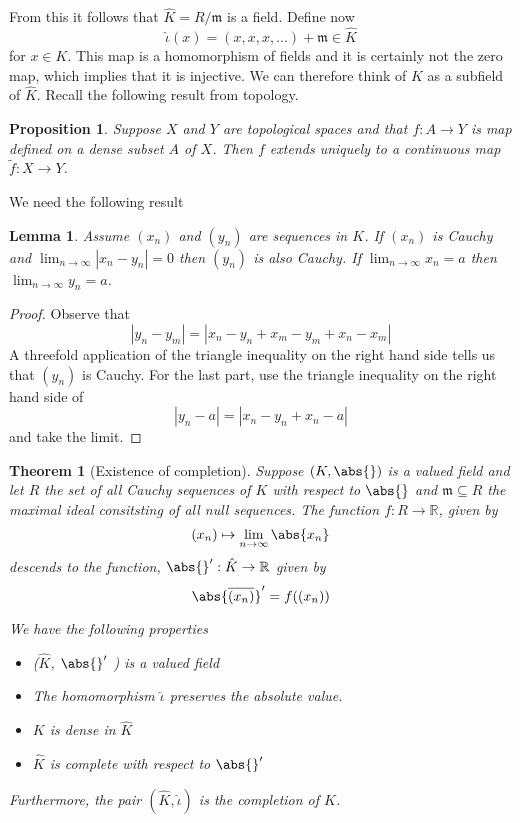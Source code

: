 \documentclass{article}
\newtheorem{theorem}{Theorem}[section]
\newtheorem{proposition}{Proposition}[section]
\newtheorem{lemma}{Lemma}[section]
\newcommand{\mfrak}[1]{\mathfrak{#1}}
\newcommand{\mbb}[1]{\mathbb{#1}}
\numberwithin{equation}{section}
\begin{document}
From this it follows that $\hat K = R / \mfrak m$ is a field. Define now $$\hat \iota (x) = (x,x,x,...) + \mfrak m \in \hat K$$ for $x \in K$. This map is a homomorphism of fields and it is certainly not the zero map, which implies that it is injective. We can therefore think of $K$ as a subfield of $\hat K$. Recall the following result from topology.
\begin{proposition}\label{prop: Function on a dense set}
	Suppose $X$ and $Y$ are topological spaces and that $f : A \to Y$ is map defined on a dense subset $A$ of $X$. Then $f$ extends uniquely to a continuous map $\tilde f : X \to Y$.
\end{proposition}
We need the following result

\begin{lemma}\label{lem: Helper result for existence of completion}
	Assume $(x_n)$ and $(y_n)$ are sequences in $K$. If $(x_n)$ is Cauchy and $\lim_{n \to \infty} |x_n - y_n| = 0$ then $(y_n)$ is also Cauchy. If $\lim_{n \to \infty} x_n = a$ then $\lim_{n \to \infty} y_n = a$.
\end{lemma}

\begin{proof}
	Observe that
	$$
    	|y_n - y_m| = |x_n - y_n + x_m - y_m + x_n - x_m|
    	$$
	A threefold application of the triangle inequality on the right hand side tells us that $(y_n)$ is Cauchy. For the last part, use the triangle inequality on the right hand side of
	$$|y_n - a| = |x_n - y_n + x_n - a|$$
	and take the limit.
\end{proof}

\begin{theorem}[Existence of completion]\label{thm: Existence of completion}
	Suppose $(K, \abs{})$ is a valued field and let $R$ the set of all Cauchy sequences of $K$ with respect to $\abs{}$ and $\mfrak m \subseteq R$ the maximal ideal consitsting of all null sequences. The function $f : R \to \mbb R$, given by
	$$(x_n) \mapsto \lim_{n \to \infty} \abs{x_n}$$
	descends to the function, $\abs{}' : \hat K \to \mbb R$ given by
	$$\abs{\overline {(x_n)}}' = f( (x_n) )$$

	We have the following properties
	\begin{itemize}
    	\item ($\hat K$, $\abs{}'$ ) is a valued field
    	\item The homomorphism $\hat \iota$ preserves the absolute value.
    	\item $K$ is dense in $\hat K$
    	\item $\hat K$ is complete with respect to $\abs{}'$
	\end{itemize}

	Furthermore, the pair $(\hat K, \hat \iota)$ is the completion of $K$.

\end{theorem}
\end{document}
